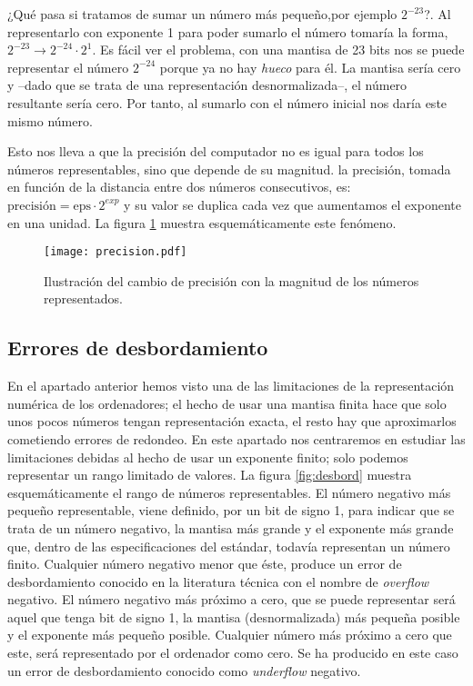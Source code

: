 ¿Qué pasa si tratamos de sumar un número más pequeño,por ejemplo $2^{-23}$?. Al representarlo con exponente 1 para poder sumarlo el número tomaría la forma, $2^{-23}\rightarrow 2^{-24}\cdot2^{1}$. Es fácil ver el problema, con una mantisa de 23 bits nos se puede representar el número $2^{-24}$ porque ya no hay \emph{hueco} para él. La mantisa sería cero y --dado que se trata de una representación desnormalizada--, el número resultante sería cero. Por tanto, al sumarlo con el número inicial nos daría este mismo número.

Esto nos lleva a que la precisión del computador no es igual para todos los números representables, sino que depende de su magnitud. la precisión, tomada en función de la distancia entre dos números consecutivos, es: $\text{precisión}=\text{eps}\cdot 2^{exp}$ y su valor se duplica cada vez que aumentamos el exponente en una unidad. La figura \ref{fig:precision} muestra esquemáticamente este fenómeno.
\begin{figure}[h]
	\centering
		\texttt{[image: precision.pdf]}
	\caption{Ilustración del cambio de precisión con la magnitud de los números representados.}
	\label{fig:precision}
\end{figure}

\subsection{Errores de desbordamiento}
En el apartado anterior hemos visto una de las limitaciones de la representación numérica de los ordenadores; el hecho de usar una mantisa finita hace que solo unos pocos números tengan representación exacta, el resto hay que aproximarlos cometiendo errores de redondeo. En este apartado nos centraremos en estudiar las limitaciones debidas al hecho de usar un exponente finito; solo podemos representar un rango limitado de valores.
La figura \ref{fig:desbord} muestra esquemáticamente el rango de números representables. El número negativo más pequeño representable, viene definido, por un bit de signo 1, para indicar que se trata de un número negativo, la mantisa más grande y el exponente más grande que, dentro de las especificaciones del estándar, todavía representan un número finito. Cualquier número negativo menor que éste, produce un error de desbordamiento conocido en la literatura técnica con el nombre de \emph{overflow} negativo. El número negativo más próximo a cero, que se puede representar será aquel que tenga bit de signo 1, la mantisa (desnormalizada) más pequeña posible y el exponente más pequeño posible. Cualquier número más próximo a cero que este, será representado por el ordenador como cero. Se ha producido en este caso un error de desbordamiento conocido como \emph{underflow} negativo. 

